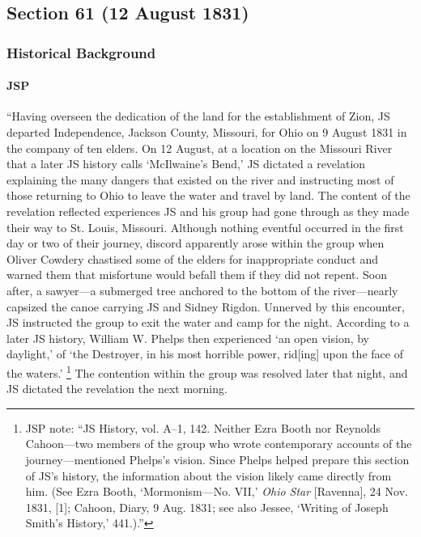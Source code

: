 \subsection{Section 61 (12 August 1831)}
	\label{DC61}
	
	\subsubsection{Historical Background}
		\label{DC61-HB}
		
		\paragraph{JSP}
		
			``Having overseen the dedication of the land for the establishment of Zion, JS departed Independence, Jackson County, Missouri, for Ohio on 9 August 1831 in the company of ten elders. On 12 August, at a location on the Missouri River that a later JS history calls `McIlwaine's Bend,' JS dictated a revelation explaining the many dangers that existed on the river and instructing most of those returning to Ohio to leave the water and travel by land. The content of the revelation reflected experiences JS and his group had gone through as they made their way to St. Louis, Missouri. Although nothing eventful occurred in the first day or two of their journey, discord apparently arose within the group when Oliver Cowdery chastised some of the elders for inappropriate conduct and warned them that misfortune would befall them if they did not repent. Soon after, a sawyer---a submerged tree anchored to the bottom of the river---nearly capsized the canoe carrying JS and Sidney Rigdon. Unnerved by this encounter, JS instructed the group to exit the water and camp for the night. According to a later JS history, William W. Phelps then experienced `an open vision, by daylight,' of `the Destroyer, in his most horrible power, rid[ing] upon the face of the waters.'%
				\footnote{%
					JSP note: ``JS History, vol. A--1, 142. Neither Ezra Booth nor Reynolds Cahoon---two members of the group who wrote contemporary accounts of the journey---mentioned Phelps's vision. Since Phelps helped prepare this section of JS's history, the information about the vision likely came directly from him. (See Ezra Booth, `Mormonism---No. VII,' \textit{Ohio Star} [Ravenna], 24 Nov. 1831, [1]; Cahoon, Diary, 9 Aug. 1831; see also Jessee, `Writing of Joseph Smith's History,' 441.).''
					}
			The contention within the group was resolved later that night, and JS dictated the revelation the next morning.
				
